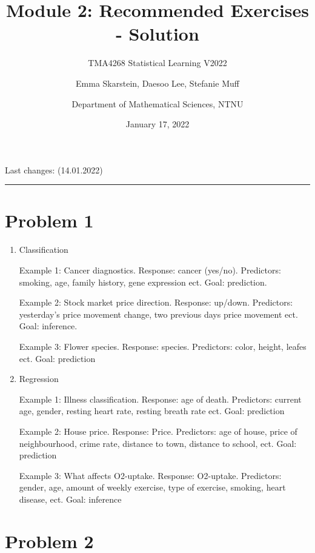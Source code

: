 \documentclass[
]{article}
\title{Module 2: Recommended Exercises - Solution}
\subtitle{TMA4268 Statistical Learning V2022}
\author{Emma Skarstein, Daesoo Lee, Stefanie Muff \and Department of
Mathematical Sciences, NTNU}
\date{January 17, 2022}
\begin{document}
\maketitle

Last changes: (14.01.2022)

\begin{center}\rule{0.5\linewidth}{0.5pt}\end{center}

\hypertarget{problem-1}{%
\section{Problem 1}\label{problem-1}}

\begin{enumerate}
\def\labelenumi{\alph{enumi})}
\item
  Classification

  Example 1: Cancer diagnostics. Response: cancer (yes/no). Predictors:
  smoking, age, family history, gene expression ect. Goal: prediction.

  Example 2: Stock market price direction. Response: up/down.
  Predictors: yesterday's price movement change, two previous days price
  movement ect. Goal: inference.

  Example 3: Flower species. Response: species. Predictors: color,
  height, leafes ect. Goal: prediction
\item
  Regression

  Example 1: Illness classification. Response: age of death. Predictors:
  current age, gender, resting heart rate, resting breath rate ect.
  Goal: prediction

  Example 2: House price. Response: Price. Predictors: age of house,
  price of neighbourhood, crime rate, distance to town, distance to
  school, ect. Goal: prediction

  Example 3: What affects O2-uptake. Response: O2-uptake. Predictors:
  gender, age, amount of weekly exercise, type of exercise, smoking,
  heart disease, ect. Goal: inference
\end{enumerate}

\hypertarget{problem-2}{%
\section{Problem 2}\label{problem-2}}
\end{document}
